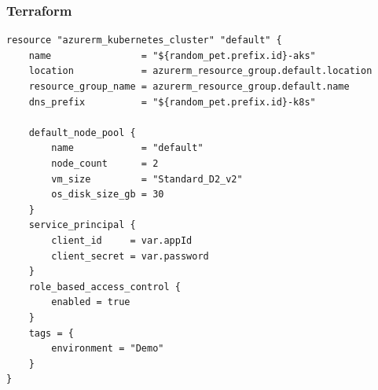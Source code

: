 \documentclass{../../slides-style}
\begin{document}
    \begin{frame}[fragile]
        \frametitle{Terraform}
        \begin{scriptsize}
            \begin{verbatim}
resource "azurerm_kubernetes_cluster" "default" {
    name                = "${random_pet.prefix.id}-aks"
    location            = azurerm_resource_group.default.location
    resource_group_name = azurerm_resource_group.default.name
    dns_prefix          = "${random_pet.prefix.id}-k8s"
    
    default_node_pool {
        name            = "default"
        node_count      = 2
        vm_size         = "Standard_D2_v2"
        os_disk_size_gb = 30
    }
    service_principal {
        client_id     = var.appId
        client_secret = var.password
    }
    role_based_access_control {
        enabled = true
    }
    tags = {
        environment = "Demo"
    }
}
            \end{verbatim}
        \end{scriptsize}
    \end{frame}
\end{document}
